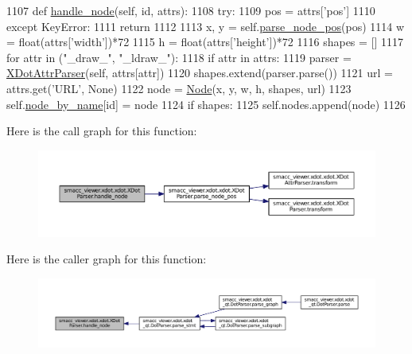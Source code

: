 \begin{DoxyCode}
1107     \textcolor{keyword}{def }\hyperlink{classsmacc__viewer_1_1xdot_1_1xdot_1_1XDotParser_a2447765fab39800834af0c26834398cd}{handle\_node}(self, id, attrs):
1108         \textcolor{keywordflow}{try}:
1109             pos = attrs[\textcolor{stringliteral}{'pos'}]
1110         \textcolor{keywordflow}{except} KeyError:
1111             \textcolor{keywordflow}{return}
1112 
1113         x, y = self.\hyperlink{classsmacc__viewer_1_1xdot_1_1xdot_1_1XDotParser_aa8c1803b0418e65b40bda63bf127248b}{parse\_node\_pos}(pos)
1114         w = float(attrs[\textcolor{stringliteral}{'width'}])*72
1115         h = float(attrs[\textcolor{stringliteral}{'height'}])*72
1116         shapes = []
1117         \textcolor{keywordflow}{for} attr \textcolor{keywordflow}{in} (\textcolor{stringliteral}{"\_draw\_"}, \textcolor{stringliteral}{"\_ldraw\_"}):
1118             \textcolor{keywordflow}{if} attr \textcolor{keywordflow}{in} attrs:
1119                 parser = \hyperlink{classsmacc__viewer_1_1xdot_1_1xdot_1_1XDotAttrParser}{XDotAttrParser}(self, attrs[attr])
1120                 shapes.extend(parser.parse())
1121         url = attrs.get(\textcolor{stringliteral}{'URL'}, \textcolor{keywordtype}{None})
1122         node = \hyperlink{classsmacc__viewer_1_1xdot_1_1xdot_1_1Node}{Node}(x, y, w, h, shapes, url)
1123         self.\hyperlink{classsmacc__viewer_1_1xdot_1_1xdot_1_1XDotParser_ab2ae36f76adbaf2c08f05eb5a3fb5557}{node\_by\_name}[id] = node
1124         \textcolor{keywordflow}{if} shapes:
1125             self.nodes.append(node)
1126 
\end{DoxyCode}


Here is the call graph for this function\+:
\nopagebreak
\begin{figure}[H]
\begin{center}
\leavevmode
\includegraphics[width=350pt]{classsmacc__viewer_1_1xdot_1_1xdot_1_1XDotParser_a2447765fab39800834af0c26834398cd_cgraph}
\end{center}
\end{figure}




Here is the caller graph for this function\+:
\nopagebreak
\begin{figure}[H]
\begin{center}
\leavevmode
\includegraphics[width=350pt]{classsmacc__viewer_1_1xdot_1_1xdot_1_1XDotParser_a2447765fab39800834af0c26834398cd_icgraph}
\end{center}
\end{figure}


